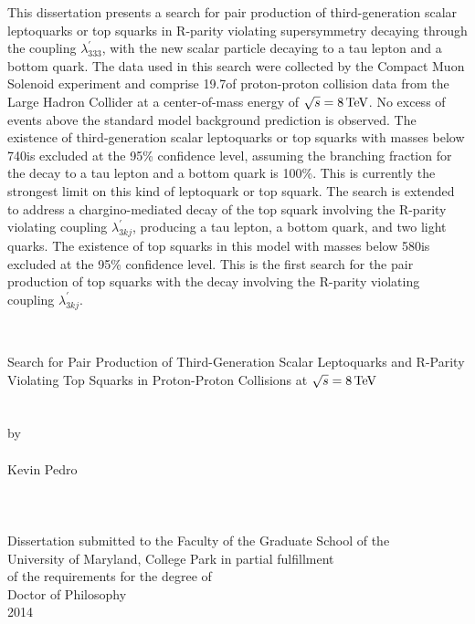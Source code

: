 \documentclass[12pt]{thesis}  %
\renewcommand{\baselinestretch}{2}
\begin{document}
This dissertation presents a search for pair production of third-generation scalar leptoquarks or top squarks in R-parity violating supersymmetry decaying through the coupling $\lambda^{\prime}_{333}$, with the new scalar particle decaying to a tau lepton and a bottom quark. The data used in this search were collected by the Compact Muon Solenoid experiment and comprise 19.7\fbinv of proton-proton collision data from the Large Hadron Collider at a center-of-mass energy of $\sqrt{s}=8\,\text{Te\hspace{-.08em}V}$. No excess of events above the standard model background prediction is observed. The existence of third-generation scalar leptoquarks or top squarks with masses below 740\GeV is excluded at the 95\% confidence level, assuming the branching fraction for the decay to a tau lepton and a bottom quark is 100\%. This is currently the strongest limit on this kind of leptoquark or top squark. The search is extended to address a chargino-mediated decay of the top squark involving the R-parity violating coupling $\lambda^{\prime}_{3kj}$, producing a tau lepton, a bottom quark, and two light quarks. The existence of top squarks in this model with masses below 580\GeV is excluded at the 95\% confidence level. This is the first search for the pair production of top squarks with the decay involving the R-parity violating coupling $\lambda^{\prime}_{3kj}$.



\thispagestyle{empty}
\hbox{\ }
\vspace{1in}
\renewcommand{\baselinestretch}{1}
\small\normalsize
\begin{center}

\large{Search for Pair Production of Third-Generation Scalar Leptoquarks and R-Parity Violating Top Squarks in Proton-Proton Collisions at $\sqrt{s} = 8\,\text{Te\hspace{-.08em}V}$}\\
\ \\
\ \\
\large{by} \\
\ \\
\large{Kevin Pedro}%
\ \\
\ \\
\ \\
\ \\
\normalsize
Dissertation submitted to the Faculty of the Graduate School of the \\
University of Maryland, College Park in partial fulfillment \\
of the requirements for the degree of \\
Doctor of Philosophy \\
2014
\end{center}
\end{document}
